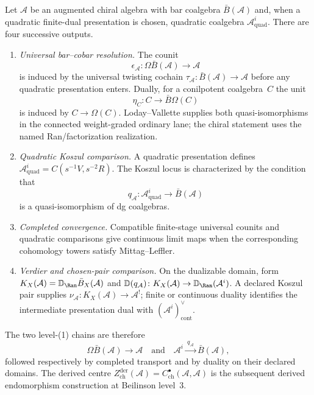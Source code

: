 \begin{proposition}
\label{prop:existence-four-loci}
Let $\mathcal A$ be an augmented chiral algebra with bar coalgebra
$\bar B(\mathcal A)$ and, when a quadratic finite-dual presentation is
chosen, quadratic coalgebra $\mathcal A^i_{\mathrm{quad}}$.
There are four successive outputs.
\begin{enumerate}
\item \emph{Universal bar--cobar resolution.} The counit
 \[
 \epsilon_{\mathcal A}\colon
 \Omega\bar B(\mathcal A)\longrightarrow \mathcal A
 \]
 is induced by the universal twisting cochain
 $\tau_{\mathcal A}\colon \bar B(\mathcal A)\to\mathcal A$ before any
 quadratic presentation enters. Dually, for a conilpotent coalgebra~$C$
 the unit
 \[
 \eta_C\colon C\longrightarrow \bar B\Omega(C)
 \]
 is induced by $C\to\Omega(C)$.  Loday--Vallette
 \cite[Corollary~2.3.4]{LV12} supplies both quasi-isomorphisms in the
 connected weight-graded ordinary lane; the chiral statement uses the
 named Ran/factorization realization.
\item \emph{Quadratic Koszul comparison.} A quadratic presentation
 defines $\mathcal A^i_{\mathrm{quad}}=C(s^{-1}V,s^{-2}R)$.  The Koszul locus is
 characterized by the condition that
 \[
 q_{\mathcal A}\colon
 \mathcal A^i_{\mathrm{quad}}\longrightarrow\bar B(\mathcal A)
 \]
 is a quasi-isomorphism of dg coalgebras.
\item \emph{Completed convergence.} Compatible finite-stage universal
 counits and quadratic comparisons give continuous limit maps when the
 corresponding cohomology towers satisfy Mittag--Leffler.
\item \emph{Verdier and chosen-pair comparison.} On the dualizable
 domain, form
 $K_X(\mathcal A)=\mathbb D_{\Ran}\bar B_X(\mathcal A)$ and
 $\mathbb D(q_{\mathcal A})\colon K_X(\mathcal A)\to
 \mathbb D_{\Ran}(\mathcal A^i)$.  A declared Koszul pair supplies
 $\nu_{\mathcal A}\colon K_X(\mathcal A)\to\mathcal A^!$; finite or
 continuous duality identifies the intermediate presentation dual
 with $(\mathcal A^i)^\vee_{\mathrm{cont}}$.
\end{enumerate}
The two level-(1) chains are therefore
\[
\Omega\bar B(\mathcal A)\longrightarrow\mathcal A
\quad\text{and}\quad
\mathcal A^i\xrightarrow{\ q_{\mathcal A}\ }\bar B(\mathcal A),
\]
followed respectively by completed transport and by duality on their
declared domains.  The derived centre
$Z^{\mathrm{der}}_{\mathrm{ch}}(\mathcal A)
=C^\bullet_{\mathrm{ch}}(\mathcal A,\mathcal A)$ is the subsequent
derived endomorphism construction at Beilinson level~$3$.
\end{proposition}


